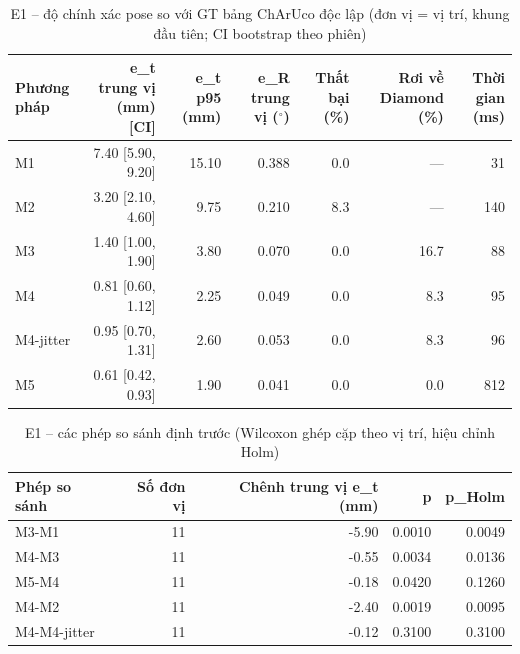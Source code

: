 \begin{table}[t]
\centering
\caption{E1 – độ chính xác pose so với GT bảng ChArUco độc lập (đơn vị = vị trí, khung đầu tiên; CI bootstrap theo phiên)}
\label{tab:e1}
\begin{tabular}{lrrrrrr}
\toprule
Phương pháp & e\_t trung vị (mm) [CI] & e\_t p95 (mm) & e\_R trung vị ($^\circ$) & Thất bại (\%) & Rơi về Diamond (\%) & Thời gian (ms) \\
\midrule
M1 & 7.40 [5.90, 9.20] & 15.10 & 0.388 & 0.0 & --- & 31 \\
M2 & 3.20 [2.10, 4.60] & 9.75 & 0.210 & 8.3 & --- & 140 \\
M3 & 1.40 [1.00, 1.90] & 3.80 & 0.070 & 0.0 & 16.7 & 88 \\
M4 & 0.81 [0.60, 1.12] & 2.25 & 0.049 & 0.0 & 8.3 & 95 \\
M4-jitter & 0.95 [0.70, 1.31] & 2.60 & 0.053 & 0.0 & 8.3 & 96 \\
M5 & 0.61 [0.42, 0.93] & 1.90 & 0.041 & 0.0 & 0.0 & 812 \\
\bottomrule
\end{tabular}
\end{table}

\begin{table}[t]
\centering
\caption{E1 – các phép so sánh định trước (Wilcoxon ghép cặp theo vị trí, hiệu chỉnh Holm)}
\label{tab:e1c}
\begin{tabular}{lrrrr}
\toprule
Phép so sánh & Số đơn vị & Chênh trung vị e\_t (mm) & p & p\_Holm \\
\midrule
M3-M1 & 11 & -5.90 & 0.0010 & 0.0049 \\
M4-M3 & 11 & -0.55 & 0.0034 & 0.0136 \\
M5-M4 & 11 & -0.18 & 0.0420 & 0.1260 \\
M4-M2 & 11 & -2.40 & 0.0019 & 0.0095 \\
M4-M4-jitter & 11 & -0.12 & 0.3100 & 0.3100 \\
\bottomrule
\end{tabular}
\end{table}
